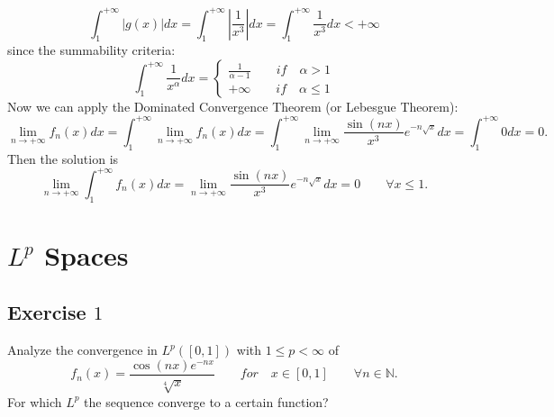 \documentclass[a4paper, twoside, openany]{book}
\begin{document}
$$\int_1^{+\infty} |g(x)| dx = \int_1^{+\infty} |\frac{1}{x^3}| dx = \int_1^{+\infty} \frac{1}{x^3} dx < +\infty$$
since the summability criteria:
$$\int_1^{+\infty} \frac{1}{x^{\alpha}} dx = \begin{cases}
												\frac{1}{\alpha - 1} \qquad if \quad \alpha > 1 \\
												+\infty \qquad if \quad \alpha \leq 1
											\end{cases}$$
Now we can apply the Dominated Convergence Theorem (or Lebesgue Theorem):
$$\lim_{n \rightarrow +\infty} f_n(x) dx = \int_1^{+\infty} \lim_{n \rightarrow +\infty} f_n(x) dx = \int_1^{+\infty} \lim_{n \rightarrow +\infty} \frac{\sin(nx)}{x^3} e^{-n \sqrt{x}} dx = \int_1^{+\infty} 0 dx = 0.$$
Then the solution is
$$\lim_{n \rightarrow + \infty} \int_1^{+\infty} f_n(x) dx = \lim_{n \rightarrow +\infty} \frac{\sin(nx)}{x^3} e^{-n \sqrt{x}} dx = 0 \qquad \forall x \leq 1.$$
\clearpage



\chapter{$L^p$ Spaces}
\section*{Exercise $1$}
Analyze the convergence in $L^p([0, 1])$ with $1 \leq p < \infty$ of
$$f_n(x) = \frac{\cos(nx) e^{-n x}}{\sqrt[4]{x}} \qquad for \quad x \in [0, 1] \qquad \forall n \in \mathbb{N}.$$
For which $L^p$ the sequence converge to a certain function?
\end{document}
